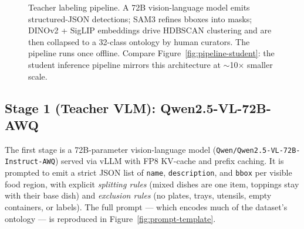 \begin{figure}[t]
\centering
{}
\caption{Teacher labeling pipeline. A 72B vision-language model emits
structured-JSON detections; SAM3 refines bboxes into masks; DINOv2 + SigLIP
embeddings drive HDBSCAN clustering and are then collapsed to a 32-class
ontology by human curators. The pipeline runs once offline. Compare
Figure~\ref{fig:pipeline-student}: the student inference pipeline mirrors
this architecture at $\sim$10$\times$ smaller scale.}
\label{fig:pipeline-teacher}
\end{figure}

\subsection{Stage 1 (Teacher VLM): Qwen2.5-VL-72B-AWQ}
\label{sec:de:vlm}

The first stage is a 72B-parameter vision-language model
(\texttt{Qwen/Qwen2.5-VL-72B-Instruct-AWQ}) served via vLLM with FP8 KV-cache
and prefix caching. It is prompted to emit a strict JSON list of
\texttt{name}, \texttt{description}, and \texttt{bbox} per visible food region,
with explicit \emph{splitting rules} (mixed dishes are one item, toppings stay
with their base dish) and \emph{exclusion rules} (no plates, trays, utensils,
empty containers, or labels). The full prompt --- which encodes much of the
dataset's ontology --- is reproduced in Figure~\ref{fig:prompt-template}.

